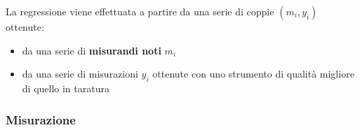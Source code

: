\documentclass[
  letterpaper,
  DIV=11,
  numbers=noendperiod,
  oneside]{scrartcl}
\newenvironment{Shaded}{\begin{snugshade}}{\end{snugshade}}
\newcommand{\AttributeTok}[1]{\textcolor[rgb]{0.40,0.45,0.13}{#1}}
\newcommand{\DecValTok}[1]{\textcolor[rgb]{0.68,0.00,0.00}{#1}}
\newcommand{\FunctionTok}[1]{\textcolor[rgb]{0.28,0.35,0.67}{#1}}
\newcommand{\NormalTok}[1]{\textcolor[rgb]{0.00,0.23,0.31}{#1}}
\newcommand{\OtherTok}[1]{\textcolor[rgb]{0.00,0.23,0.31}{#1}}
\newcommand{\SpecialCharTok}[1]{\textcolor[rgb]{0.37,0.37,0.37}{#1}}
\newcommand{\StringTok}[1]{\textcolor[rgb]{0.13,0.47,0.30}{#1}}
\providecommand{\tightlist}{%
  \setlength{\itemsep}{0pt}\setlength{\parskip}{0pt}}
\begin{document}
La regressione viene effettuata a partire da una serie di coppie
\((m_i, y_i)\) ottenute:

\begin{itemize}
\tightlist
\item
  da una serie di \textbf{misurandi noti} \(m_i\)
\item
  da una serie di misurazioni \(y_i\) ottenute con uno strumento di
  qualità migliore di quello in taratura
\end{itemize}

\subsubsection{Misurazione}

\begin{Shaded}
\end{Shaded}
\end{document}
